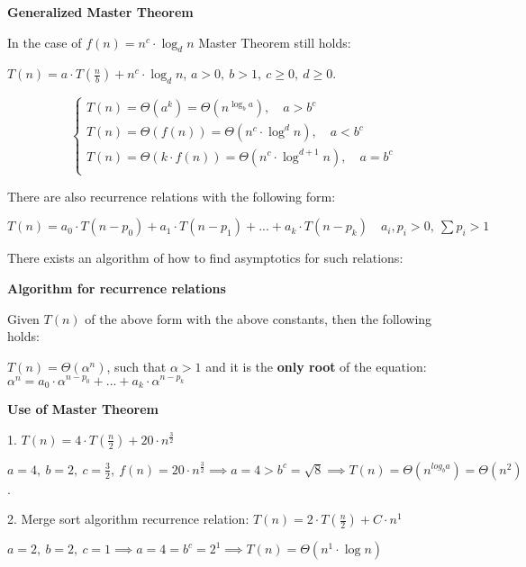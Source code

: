 
\begin{theorem}
    \textbf{Generalized Master Theorem}

    In the case of $f(n) = n^c \cdot \log_{d}{n}$ Master Theorem still holds:

    $T(n) = a \cdot T(\frac{n}{b}) + n^c \cdot \log_{d}{n}$, $a>0, \ b>1, \ c\geq 0, \ d \geq 0$.

    \begin{equation}
        \begin{cases}
            T(n) = \Theta(a^k) = \Theta(n^{\log_{b}{a}}), \quad a > b^c\\
            T(n) = \Theta(f(n)) = \Theta(n^c \cdot \log^{d}{n}), \quad a < b^c\\
            T(n) = \Theta(k \cdot f(n)) = \Theta(n^c \cdot \log^{d+1}{n}), \quad a = b^c\\
        \end{cases}
    \end{equation}

\end{theorem}



There are also recurrence relations with the following form:

$T(n) = a_0 \cdot T(n - p_0) + a_1 \cdot T(n - p_1) + ... + a_k \cdot T(n-p_k) \quad a_i, p_i > 0, \ \sum p_i > 1$

There exists an algorithm of how to find asymptotics for such relations:

\begin{theorem}
    \textbf{Algorithm for recurrence relations}

    Given $T(n)$ of the above form with the above constants, then the following holds:

    $T(n) = \Theta(\alpha^n)$, such that $\alpha > 1$ and it is the \textbf{only root} of the equation: $\alpha^n = a_0 \cdot \alpha^{n-p_0} + ... + a_k \cdot \alpha^{n-p_k}$


\end{theorem}


\begin{example}
    \textbf{Use of Master Theorem}

    1. $T(n) = 4 \cdot T(\frac{n}{2}) + 20 \cdot n^\frac{3}{2}$

    $a=4, \ b=2, \ c=\frac{3}{2}, \ f(n)=20\cdot n^\frac{3}{2} \implies a=4 > b^c=\sqrt{8} \implies T(n) = \Theta(n^{log_{b}{a}}) = \Theta(n^2)$.

    2. Merge sort algorithm recurrence relation: $T(n) = 2 \cdot T(\frac{n}{2}) + C\cdot n^1$

    $a=2, \ b=2, \ c=1 \implies a=4 = b^c=2^1 \implies T(n) = \Theta(n^1 \cdot \log{n})$

\end{example}


